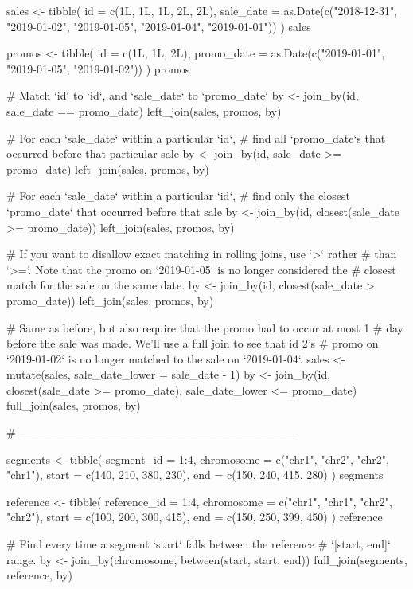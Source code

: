 \documentclass[a4paper]{book}
\begin{document}
\begin{Examples}
\begin{ExampleCode}
sales <- tibble(
  id = c(1L, 1L, 1L, 2L, 2L),
  sale_date = as.Date(c("2018-12-31", "2019-01-02", "2019-01-05", "2019-01-04", "2019-01-01"))
)
sales

promos <- tibble(
  id = c(1L, 1L, 2L),
  promo_date = as.Date(c("2019-01-01", "2019-01-05", "2019-01-02"))
)
promos

# Match `id` to `id`, and `sale_date` to `promo_date`
by <- join_by(id, sale_date == promo_date)
left_join(sales, promos, by)

# For each `sale_date` within a particular `id`,
# find all `promo_date`s that occurred before that particular sale
by <- join_by(id, sale_date >= promo_date)
left_join(sales, promos, by)

# For each `sale_date` within a particular `id`,
# find only the closest `promo_date` that occurred before that sale
by <- join_by(id, closest(sale_date >= promo_date))
left_join(sales, promos, by)

# If you want to disallow exact matching in rolling joins, use `>` rather
# than `>=`. Note that the promo on `2019-01-05` is no longer considered the
# closest match for the sale on the same date.
by <- join_by(id, closest(sale_date > promo_date))
left_join(sales, promos, by)

# Same as before, but also require that the promo had to occur at most 1
# day before the sale was made. We'll use a full join to see that id 2's
# promo on `2019-01-02` is no longer matched to the sale on `2019-01-04`.
sales <- mutate(sales, sale_date_lower = sale_date - 1)
by <- join_by(id, closest(sale_date >= promo_date), sale_date_lower <= promo_date)
full_join(sales, promos, by)

# ---------------------------------------------------------------------------

segments <- tibble(
  segment_id = 1:4,
  chromosome = c("chr1", "chr2", "chr2", "chr1"),
  start = c(140, 210, 380, 230),
  end = c(150, 240, 415, 280)
)
segments

reference <- tibble(
  reference_id = 1:4,
  chromosome = c("chr1", "chr1", "chr2", "chr2"),
  start = c(100, 200, 300, 415),
  end = c(150, 250, 399, 450)
)
reference

# Find every time a segment `start` falls between the reference
# `[start, end]` range.
by <- join_by(chromosome, between(start, start, end))
full_join(segments, reference, by)


\end{ExampleCode}
\end{Examples}
\end{document}

